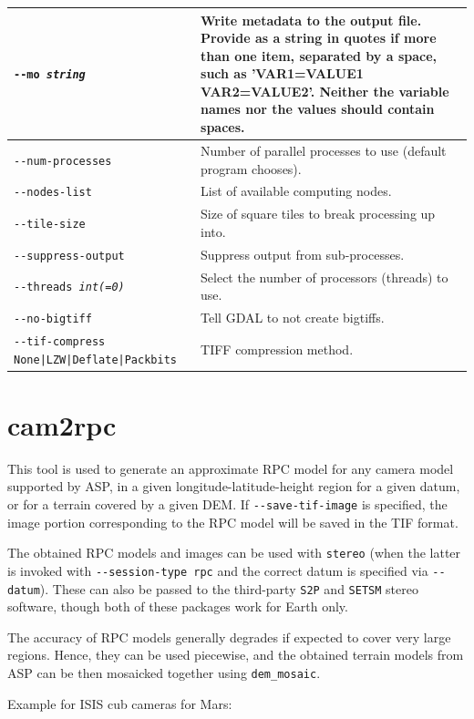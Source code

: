 \begin{longtable}{|l|p{9.5cm}|}
\texttt{-\/-mo \textit{string}} & Write metadata to the output file. Provide as a string in quotes if more than one item, separated by a space, such as 'VAR1=VALUE1 VAR2=VALUE2'. Neither the variable names nor the values should contain spaces. \\ \hline
\texttt{-\/-num-processes} & Number of parallel processes to use (default program chooses).\\ \hline
\texttt{-\/-nodes-list} & List of available computing nodes.\\ \hline
\texttt{-\/-tile-size} & Size of square tiles to break processing up into.\\ \hline
\texttt{-\/-suppress-output} & Suppress output from sub-processes.\\ \hline
\texttt{-\/-threads \textit{int(=0)}} & Select the number of processors (threads) to use.\\ \hline
\texttt{-\/-no-bigtiff} & Tell GDAL to not create bigtiffs.\\ \hline
\texttt{-\/-tif-compress None|LZW|Deflate|Packbits} & TIFF compression method.\\ \hline
\end{longtable}

\clearpage

\section{cam2rpc}
\label{cam2rpc}

This tool is used to generate an approximate RPC model for any camera
model supported by ASP, in a given longitude-latitude-height region for
a given datum, or for a terrain covered by a given DEM. If
\texttt{-\/-save-tif-image} is specified, the image portion
corresponding to the RPC model will be saved in the TIF format. 

The obtained RPC models and images can be used with \texttt{stereo}
(when the latter is invoked with \texttt{-\/-session-type rpc} and the
correct datum is specified via \texttt{-\/-datum}). These can also be
passed to the third-party \texttt{S2P} and \texttt{SETSM} stereo
software, though both of these packages work for Earth only.

The accuracy of RPC models generally degrades if expected to cover
very large regions. Hence, they can be used piecewise, and
the obtained terrain models from ASP can be then mosaicked together
using \texttt{dem\_mosaic}.

Example for ISIS cub cameras for Mars:


